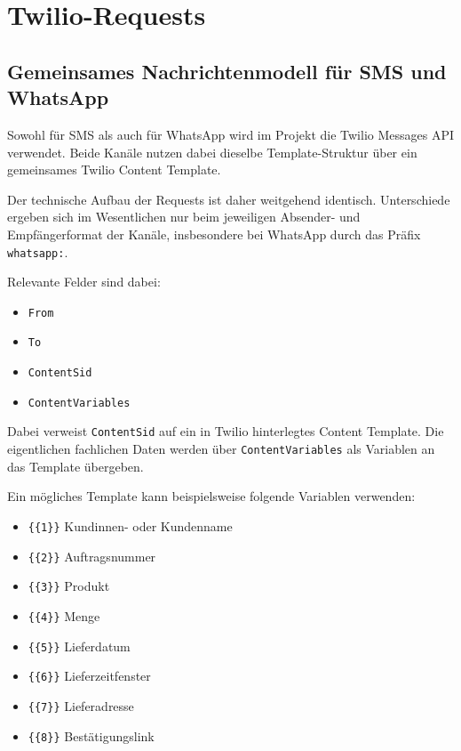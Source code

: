 \documentclass[12pt,a4paper]{article}
\begin{document}
\section{Twilio-Requests}

\subsection{Gemeinsames Nachrichtenmodell für SMS und WhatsApp}

Sowohl für SMS als auch für WhatsApp wird im Projekt die
Twilio Messages API verwendet. Beide Kanäle nutzen dabei
dieselbe Template-Struktur über ein gemeinsames
Twilio Content Template.

Der technische Aufbau der Requests ist daher weitgehend identisch.
Unterschiede ergeben sich im Wesentlichen nur beim jeweiligen
Absender- und Empfängerformat der Kanäle, insbesondere bei
WhatsApp durch das Präfix \texttt{whatsapp:}.

Relevante Felder sind dabei:

\begin{itemize}
    \item \texttt{From}
    \item \texttt{To}
    \item \texttt{ContentSid}
    \item \texttt{ContentVariables}
\end{itemize}

Dabei verweist \texttt{ContentSid} auf ein in Twilio hinterlegtes
Content Template. Die eigentlichen fachlichen Daten werden über
\texttt{ContentVariables} als Variablen an das Template übergeben.

Ein mögliches Template kann beispielsweise folgende Variablen verwenden:

\begin{itemize}
    \item \texttt{\{\{1\}\}} Kundinnen- oder Kundenname
    \item \texttt{\{\{2\}\}} Auftragsnummer
    \item \texttt{\{\{3\}\}} Produkt
    \item \texttt{\{\{4\}\}} Menge
    \item \texttt{\{\{5\}\}} Lieferdatum
    \item \texttt{\{\{6\}\}} Lieferzeitfenster
    \item \texttt{\{\{7\}\}} Lieferadresse
    \item \texttt{\{\{8\}\}} Bestätigungslink
\end{itemize}
\end{document}
